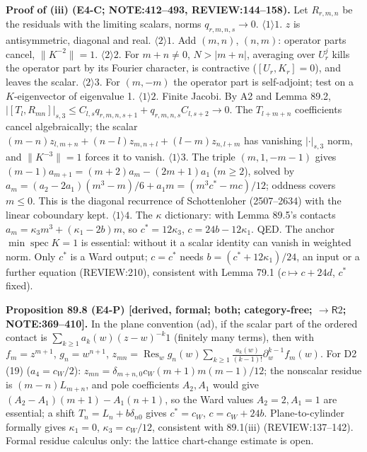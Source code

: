 \textbf{Proof of (iii) (E4-C; NOTE:412--493, REVIEW:144--158).}  Let \(R_{r,m,n}\) be the residuals with the
limiting scalars, norms \(q_{r,m,n,s}\to0\).
\(\langle1\rangle1\). \(z\) is antisymmetric, diagonal and real.  \(\langle2\rangle1\). Add \((m,n)\), \((n,m)\): operator
parts cancel, \(\|K^{-2}\|=1\).  \(\langle2\rangle2\). For \(m+n\neq0\), \(N>|m+n|\), averaging over \(U_r^j\) kills the
operator part by its Fourier character, is contractive (\([U_r,K_r]=0\)), and leaves the scalar.
\(\langle2\rangle3\). For \((m,-m)\) the operator part is self-adjoint; test on a \(K\)-eigenvector of eigenvalue 1.
\(\langle1\rangle2\). Finite Jacobi.  By A2 and Lemma 89.2,
\(|[T_l,R_{mn}]|_{s,3}\le C_{l,s}q_{r,m,n,s+1}+q_{r,m,n,s}C_{l,s+2}\to0\).  The \(T_{l+m+n}\) coefficients cancel
algebraically; the scalar \((m-n)z_{l,m+n}+(n-l)z_{m,n+l}+(l-m)z_{n,l+m}\) has vanishing \(|\cdot|_{s,3}\) norm, and
\(\|K^{-3}\|=1\) forces it to vanish.
\(\langle1\rangle3\). The triple \((m,1,-m-1)\) gives \((m-1)a_{m+1}=(m+2)a_m-(2m+1)a_1\) (\(m\ge2\)), solved by
\(a_m=(a_2-2a_1)(m^3-m)/6+a_1m=(m^3c^*-mc)/12\); oddness covers \(m\le0\).  This is the diagonal recurrence of
Schottenloher (2507--2634) with the linear coboundary kept.  \(\langle1\rangle4\). The \(\kappa\) dictionary: with
Lemma 89.5's contacts \(a_m=\kappa_3m^3+(\kappa_1-2b)m\), so \(c^*=12\kappa_3\), \(c=24b-12\kappa_1\).  QED.
The anchor \(\min\operatorname{spec}K=1\) is essential: without it a scalar identity can vanish in weighted norm.
Only \(c^*\) is a Ward output; \(c=c^*\) needs \(b=(c^*+12\kappa_1)/24\), an input or a further equation (REVIEW:210),
consistent with Lemma 79.1 (\(c\mapsto c+24d\), \(c^*\) fixed).

\textbf{Proposition 89.8 (E4-P) [derived, formal; both; category-free; \(\to\mathsf R2\); NOTE:369--410].}  In the
plane convention (ad), if the scalar part of the ordered contact is \(\sum_{k\ge1}a_k(w)(z-w)^{-k}1\) (finitely many
terms), then with \(f_m=z^{m+1}\), \(g_n=w^{n+1}\),
\(z_{mn}=\operatorname{Res}_wg_n(w)\sum_{k\ge1}\frac{a_k(w)}{(k-1)!}\partial_w^{k-1}f_m(w)\).  For D2 (19) (\(a_4=c_W/2\)):
\(z_{mn}=\delta_{m+n,0}c_W(m+1)m(m-1)/12\); the nonscalar residue is \((m-n)L_{m+n}\), and pole coefficients
\(A_2,A_1\) would give \((A_2-A_1)(m+1)-A_1(n+1)\), so the Ward values \(A_2=2,A_1=1\) are essential; a shift
\(T_n=L_n+b\delta_{n0}\) gives \(c^*=c_W\), \(c=c_W+24b\).  Plane-to-cylinder formally gives \(\kappa_1=0\),
\(\kappa_3=c_W/12\), consistent with 89.1(iii) (REVIEW:137--142).  Formal residue calculus only: the lattice chart-change
estimate is open.

